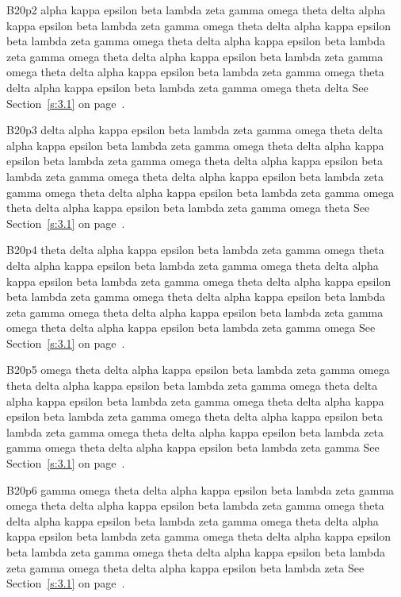 B20p2 alpha kappa epsilon beta lambda zeta gamma omega theta delta alpha kappa epsilon beta lambda zeta gamma omega theta delta alpha kappa epsilon beta lambda zeta gamma omega theta delta alpha kappa epsilon beta lambda zeta gamma omega theta delta alpha kappa epsilon beta lambda zeta gamma omega theta delta alpha kappa epsilon beta lambda zeta gamma omega theta delta alpha kappa epsilon beta lambda zeta gamma omega theta delta See Section~\ref{s:3.1} on page~\pageref{s:3.1}.

B20p3 delta alpha kappa epsilon beta lambda zeta gamma omega theta delta alpha kappa epsilon beta lambda zeta gamma omega theta delta alpha kappa epsilon beta lambda zeta gamma omega theta delta alpha kappa epsilon beta lambda zeta gamma omega theta delta alpha kappa epsilon beta lambda zeta gamma omega theta delta alpha kappa epsilon beta lambda zeta gamma omega theta delta alpha kappa epsilon beta lambda zeta gamma omega theta See Section~\ref{s:3.1} on page~\pageref{s:3.1}.

B20p4 theta delta alpha kappa epsilon beta lambda zeta gamma omega theta delta alpha kappa epsilon beta lambda zeta gamma omega theta delta alpha kappa epsilon beta lambda zeta gamma omega theta delta alpha kappa epsilon beta lambda zeta gamma omega theta delta alpha kappa epsilon beta lambda zeta gamma omega theta delta alpha kappa epsilon beta lambda zeta gamma omega theta delta alpha kappa epsilon beta lambda zeta gamma omega See Section~\ref{s:3.1} on page~\pageref{s:3.1}.

B20p5 omega theta delta alpha kappa epsilon beta lambda zeta gamma omega theta delta alpha kappa epsilon beta lambda zeta gamma omega theta delta alpha kappa epsilon beta lambda zeta gamma omega theta delta alpha kappa epsilon beta lambda zeta gamma omega theta delta alpha kappa epsilon beta lambda zeta gamma omega theta delta alpha kappa epsilon beta lambda zeta gamma omega theta delta alpha kappa epsilon beta lambda zeta gamma See Section~\ref{s:3.1} on page~\pageref{s:3.1}.

B20p6 gamma omega theta delta alpha kappa epsilon beta lambda zeta gamma omega theta delta alpha kappa epsilon beta lambda zeta gamma omega theta delta alpha kappa epsilon beta lambda zeta gamma omega theta delta alpha kappa epsilon beta lambda zeta gamma omega theta delta alpha kappa epsilon beta lambda zeta gamma omega theta delta alpha kappa epsilon beta lambda zeta gamma omega theta delta alpha kappa epsilon beta lambda zeta See Section~\ref{s:3.1} on page~\pageref{s:3.1}.

